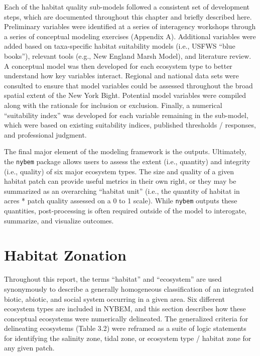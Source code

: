 \documentclass[
]{book}
\begin{document}
Each of the habitat quality sub-models followed a consistent set of development steps, which are documented throughout this chapter and briefly described here. Preliminary variables were identified at a series of interagency workshops through a series of conceptual modeling exercises (Appendix A). Additional variables were added based on taxa-specific habitat suitability models (i.e., USFWS ``blue books''), relevant tools (e.g., New England Marsh Model), and literature review. A conceptual model was then developed for each ecosystem type to better understand how key variables interact. Regional and national data sets were consulted to ensure that model variables could be assessed throughout the broad spatial extent of the New York Bight. Potential model variables were compiled along with the rationale for inclusion or exclusion. Finally, a numerical ``suitability index'' was developed for each variable remaining in the sub-model, which were based on existing suitability indices, published thresholds / responses, and professional judgment.

The final major element of the modeling framework is the outputs. Ultimately, the \texttt{nybem} package allows users to assess the extent (i.e., quantity) and integrity (i.e., quality) of six major ecosystem types. The size and quality of a given habitat patch can provide useful metrics in their own right, or they may be summarized as an overarching ``habitat unit'' (i.e., the quantity of habitat in acres * patch quality assessed on a 0 to 1 scale). While \texttt{nybem} outputs these quantities, post-processing is often required outside of the model to interogate, summarize, and visualize outcomes.

\hypertarget{habitat-zonation}{%
\section{Habitat Zonation}\label{habitat-zonation}}

Throughout this report, the terms ``habitat'' and ``ecosystem'' are used synonymously to describe a generally homogeneous classification of an integrated biotic, abiotic, and social system occurring in a given area. Six different ecosystem types are included in NYBEM, and this section describes how these conceptual ecosystems were numerically delineated. The generalized criteria for delineating ecosystems (Table 3.2) were reframed as a suite of logic statements for identifying the salinity zone, tidal zone, or ecosystem type / habitat zone for any given patch.
\end{document}
